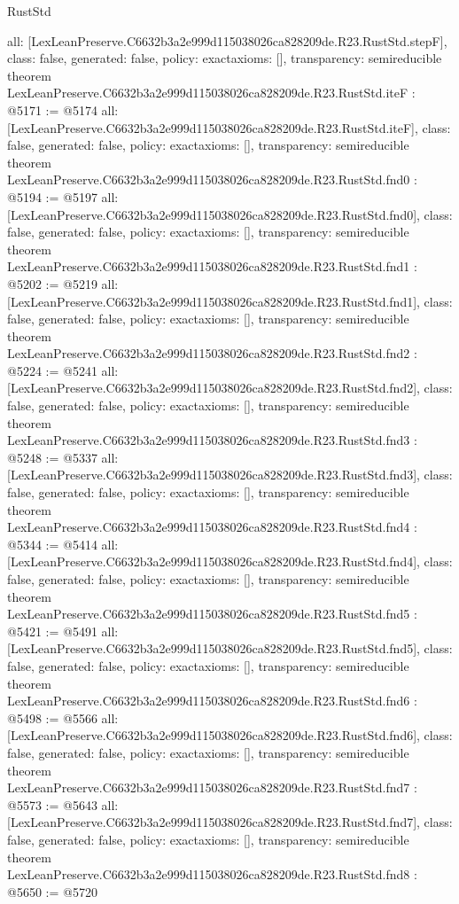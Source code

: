 \begin{lexlean}{RustStd}
\begin{coremodule}
{  all: [LexLeanPreserve.C6632b3a2e999d115038026ca828209de.R23.RustStd.stepF],
  class: false,
  generated: false,
  policy: exact{axioms: []},
  transparency: semireducible
}
theorem LexLeanPreserve.C6632b3a2e999d115038026ca828209de.R23.RustStd.iteF : @5171 := @5174 {
  all: [LexLeanPreserve.C6632b3a2e999d115038026ca828209de.R23.RustStd.iteF],
  class: false,
  generated: false,
  policy: exact{axioms: []},
  transparency: semireducible
}
theorem LexLeanPreserve.C6632b3a2e999d115038026ca828209de.R23.RustStd.fnd0 : @5194 := @5197 {
  all: [LexLeanPreserve.C6632b3a2e999d115038026ca828209de.R23.RustStd.fnd0],
  class: false,
  generated: false,
  policy: exact{axioms: []},
  transparency: semireducible
}
theorem LexLeanPreserve.C6632b3a2e999d115038026ca828209de.R23.RustStd.fnd1 : @5202 := @5219 {
  all: [LexLeanPreserve.C6632b3a2e999d115038026ca828209de.R23.RustStd.fnd1],
  class: false,
  generated: false,
  policy: exact{axioms: []},
  transparency: semireducible
}
theorem LexLeanPreserve.C6632b3a2e999d115038026ca828209de.R23.RustStd.fnd2 : @5224 := @5241 {
  all: [LexLeanPreserve.C6632b3a2e999d115038026ca828209de.R23.RustStd.fnd2],
  class: false,
  generated: false,
  policy: exact{axioms: []},
  transparency: semireducible
}
theorem LexLeanPreserve.C6632b3a2e999d115038026ca828209de.R23.RustStd.fnd3 : @5248 := @5337 {
  all: [LexLeanPreserve.C6632b3a2e999d115038026ca828209de.R23.RustStd.fnd3],
  class: false,
  generated: false,
  policy: exact{axioms: []},
  transparency: semireducible
}
theorem LexLeanPreserve.C6632b3a2e999d115038026ca828209de.R23.RustStd.fnd4 : @5344 := @5414 {
  all: [LexLeanPreserve.C6632b3a2e999d115038026ca828209de.R23.RustStd.fnd4],
  class: false,
  generated: false,
  policy: exact{axioms: []},
  transparency: semireducible
}
theorem LexLeanPreserve.C6632b3a2e999d115038026ca828209de.R23.RustStd.fnd5 : @5421 := @5491 {
  all: [LexLeanPreserve.C6632b3a2e999d115038026ca828209de.R23.RustStd.fnd5],
  class: false,
  generated: false,
  policy: exact{axioms: []},
  transparency: semireducible
}
theorem LexLeanPreserve.C6632b3a2e999d115038026ca828209de.R23.RustStd.fnd6 : @5498 := @5566 {
  all: [LexLeanPreserve.C6632b3a2e999d115038026ca828209de.R23.RustStd.fnd6],
  class: false,
  generated: false,
  policy: exact{axioms: []},
  transparency: semireducible
}
theorem LexLeanPreserve.C6632b3a2e999d115038026ca828209de.R23.RustStd.fnd7 : @5573 := @5643 {
  all: [LexLeanPreserve.C6632b3a2e999d115038026ca828209de.R23.RustStd.fnd7],
  class: false,
  generated: false,
  policy: exact{axioms: []},
  transparency: semireducible
}
theorem LexLeanPreserve.C6632b3a2e999d115038026ca828209de.R23.RustStd.fnd8 : @5650 := @5720 {
}
\end{coremodule}
\end{lexlean}
